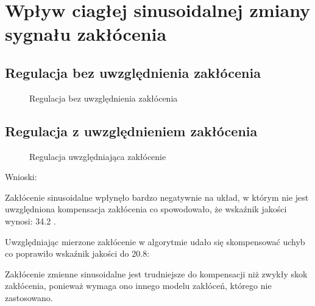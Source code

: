 \section{Wpływ ciagłej sinusoidalnej zmiany sygnału zakłócenia}
\label{projekt:zad6}

\subsection{Regulacja bez uwzględnienia zakłócenia}
\label{projekt:zad6:regulacjaBezUwzg}

\begin{figure}[H] 
    \centering
    
    \caption{Regulacja bez uwzględnienia zakłócenia}
    \label{projekt:zad6:regulacjaBezUwzg:figure}
\end{figure}

\subsection{Regulacja z uwzględnieniem zakłócenia}
\label{projekt:zad6:regulacjaZUwzg}

\begin{figure}[H] 
    \centering
    
    \caption{Regulacja uwzględniająca zakłócenie}
    \label{projekt:zad6:regulacjaZUwzg:figure}
\end{figure}

Wnioski: 

Zakłócenie sinusoidalne wpłynęło bardzo negatywnie na układ, 
w którym nie jest uwzględniona kompensacja zakłócenia co spowodowało, 
że wskaźnik jakości wynosi: \num{34.2} . 

Uwzględniając mierzone zakłócenie w algorytmie udało się skompensować uchyb co poprawiło wskaźnik jakości do \num{20.8}:

Zakłócenie zmienne sinusoidalne jest trudniejsze do kompensacji niż zwykły skok zakłócenia, 
ponieważ wymaga ono innego modelu zakłóceń, którego nie zastosowano.

\newpage
